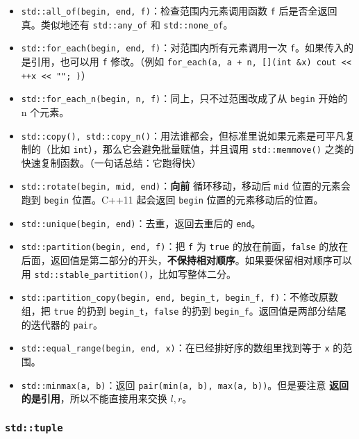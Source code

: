 \begin{itemize}
	\item \texttt{std::all_of(begin, end, f)}：检查范围内元素调用函数 \texttt{f} 后是否全返回真。类似地还有 \texttt{std::any_of} 和 \texttt{std::none_of}。
	\item \texttt{std::for_each(begin, end, f)}：对范围内所有元素调用一次 \texttt{f}。如果传入的是引用，也可以用 \texttt{f} 修改。（例如 \texttt{for_each(a, a + n, [](int &x){ cout << ++x << "\n"; })}）
	\item \texttt{std::for_each_n(begin, n, f)}：同上，只不过范围改成了从 \texttt{begin} 开始的 n 个元素。
	\item \texttt{std::copy(), std::copy_n()}：用法谁都会，但标准里说如果元素是可平凡复制的（比如 \texttt{int}），那么它会避免批量赋值，并且调用 \texttt{std::memmove()} 之类的快速复制函数。（一句话总结：它跑得快）
	\item \texttt{std::rotate(begin, mid, end)}：\textbf{向前} 循环移动，移动后 \texttt{mid} 位置的元素会跑到 \texttt{begin} 位置。C++11 起会返回 \texttt{begin} 位置的元素移动后的位置。
	\item \texttt{std::unique(begin, end)}：去重，返回去重后的 \texttt{end}。
	\item \texttt{std::partition(begin, end, f)}：把 \texttt{f} 为 \texttt{true} 的放在前面，\texttt{false} 的放在后面，返回值是第二部分的开头，\textbf{不保持相对顺序}。如果要保留相对顺序可以用 \texttt{std::stable_partition()}，比如写整体二分。
	\item \texttt{std::partition_copy(begin, end, begin_t, begin_f, f)}：不修改原数组，把 \texttt{true} 的扔到 \texttt{begin_t}，\texttt{false} 的扔到 \texttt{begin_f}。返回值是两部分结尾的迭代器的 \texttt{pair}。
	\item \texttt{std::equal_range(begin, end, x)}：在已经排好序的数组里找到等于 \texttt{x} 的范围。
	\item \texttt{std::minmax(a, b)}：返回 \texttt{pair(min(a, b), max(a, b))}。但是要注意 \textbf{返回的是引用}，所以不能直接用来交换 $l, r$。
\end{itemize}

\subsubsection[std::tuple]{\texttt{std::tuple}}

